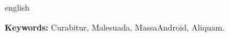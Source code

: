 \begin{resumo}[Abstract]
 \begin{otherlanguage*}{english}


\lipsum*[10-12]

\textbf{Keywords: } Curabitur, Malesuada, MassaAndroid, Aliquam. 

 \end{otherlanguage*}
\end{resumo}

